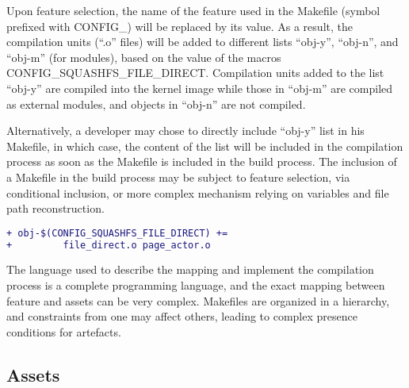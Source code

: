 Upon feature selection, the name of the feature used in the Makefile (symbol prefixed with CONFIG\_) will be replaced by its value. 
As a result, the compilation units (``.o'' files) will be added to different lists 
``obj-y'', ``obj-n'', and ``obj-m'' (for modules), based on the value of the macros CONFIG\_SQUASHFS\-\_FILE\_DIRECT.
Compilation units added to the list ``obj-y'' are compiled into the kernel image while those in ``obj-m'' are compiled as external modules, 
and objects in ``obj-n'' are not compiled.

Alternatively, a developer may chose to directly include ``obj-y'' list in his Makefile, in which case, 
the content of the list will be included in the compilation process as soon as the Makefile is included in the build process.
The inclusion of a Makefile in the build process may be subject to feature selection, via conditional inclusion, or more complex mechanism relying on variables and file path reconstruction.
\vspace{-.5ex}
\begin{lstlisting}[caption=Mapping between features and assets as performed in the Linux kernel,label=listing_makefile,language=diff] 
+ obj-$(CONFIG_SQUASHFS_FILE_DIRECT) += 
+	      file_direct.o page_actor.o
\end{lstlisting}
\vspace{-.5ex}
The language used to describe the mapping and implement the compilation process is a complete programming language, and the
exact mapping between feature and assets can be very complex. 
Makefiles are organized in a hierarchy, and constraints from one may affect others, leading to complex presence conditions for artefacts.

\subsection{Assets}

